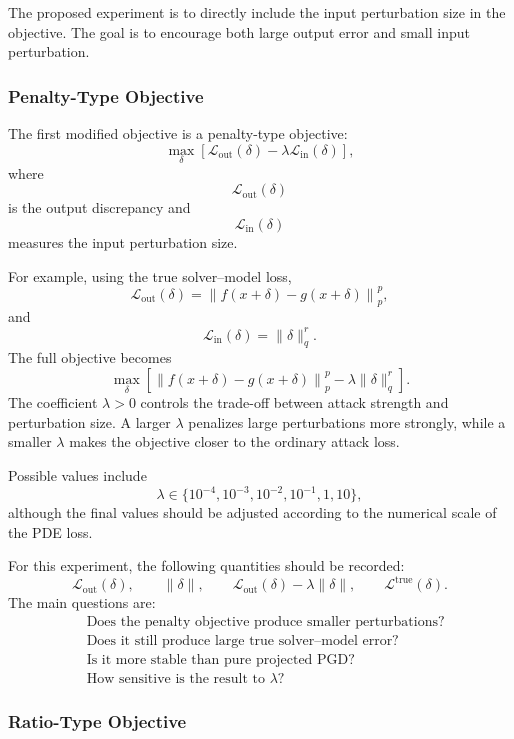 \documentclass{article}
\begin{document}
The proposed experiment is to directly include the input perturbation size in the objective. The goal is to encourage both large output error and small input perturbation.

\subsubsection{Penalty-Type Objective}

The first modified objective is a penalty-type objective:
\[
\max_\delta
\left[
\mathcal{L}_{\mathrm{out}}(\delta)
-
\lambda
\mathcal{L}_{\mathrm{in}}(\delta)
\right],
\]
where
\[
\mathcal{L}_{\mathrm{out}}(\delta)
\]
is the output discrepancy and
\[
\mathcal{L}_{\mathrm{in}}(\delta)
\]
measures the input perturbation size.

For example, using the true solver--model loss,
\[
\mathcal{L}_{\mathrm{out}}(\delta)
=
\left\|
f(x+\delta)-g(x+\delta)
\right\|_p^p,
\]
and
\[
\mathcal{L}_{\mathrm{in}}(\delta)
=
\|\delta\|_q^r.
\]
The full objective becomes
\[
\max_\delta
\left[
\left\|
f(x+\delta)-g(x+\delta)
\right\|_p^p
-
\lambda
\|\delta\|_q^r
\right].
\]
The coefficient \(\lambda>0\) controls the trade-off between attack strength and perturbation size. A larger \(\lambda\) penalizes large perturbations more strongly, while a smaller \(\lambda\) makes the objective closer to the ordinary attack loss.

Possible values include
\[
\lambda
\in
\{10^{-4},10^{-3},10^{-2},10^{-1},1,10\},
\]
although the final values should be adjusted according to the numerical scale of the PDE loss.

For this experiment, the following quantities should be recorded:
\[
\mathcal{L}_{\mathrm{out}}(\delta),
\qquad
\|\delta\|,
\qquad
\mathcal{L}_{\mathrm{out}}(\delta)-\lambda\|\delta\|,
\qquad
\mathcal{L}^{\mathrm{true}}(\delta).
\]
The main questions are:
\[
\begin{aligned}
&\text{Does the penalty objective produce smaller perturbations?}\\
&\text{Does it still produce large true solver--model error?}\\
&\text{Is it more stable than pure projected PGD?}\\
&\text{How sensitive is the result to }\lambda?
\end{aligned}
\]

\subsubsection{Ratio-Type Objective}
\end{document}
